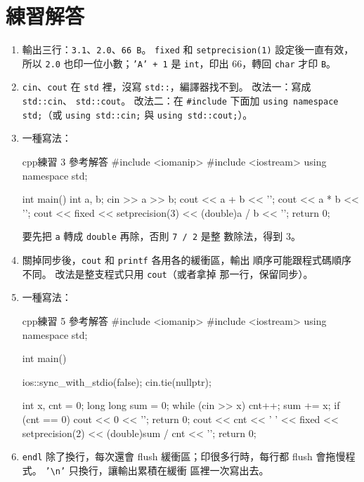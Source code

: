 \section*{練習解答}

\begin{enumerate}
\item 輸出三行：\texttt{3.1}、\texttt{2.0}、\texttt{66 B}。
\texttt{fixed} 和 \texttt{setprecision(1)} 設定後一直有效，所以
\texttt{2.0} 也印一位小數；\texttt{'A' + 1} 是 \texttt{int}，印出
$66$，轉回 \texttt{char} 才印 \texttt{B}。
\item \texttt{cin}、\texttt{cout} 在 \texttt{std} 裡，沒寫
\texttt{std::}，編譯器找不到。 改法一：寫成 \texttt{std::cin}、
\texttt{std::cout}。 改法二：在 \texttt{\#include} 下面加
\texttt{using namespace std;}（或 \texttt{using std::cin;} 與
\texttt{using std::cout;}）。
\item 一種寫法：
\begin{code}{cpp}{練習 3 參考解答}
#include <iomanip>
#include <iostream>
using namespace std;

int main() {
    int a, b;
    cin >> a >> b;
    cout << a + b << '\n';
    cout << a * b << '\n';
    cout << fixed << setprecision(3) << (double)a / b << '\n';
    return 0;
}
\end{code}
要先把 \texttt{a} 轉成 \texttt{double} 再除，否則 \texttt{7 / 2} 是整
數除法，得到 $3$。
\item 關掉同步後，\texttt{cout} 和 \texttt{printf} 各用各的緩衝區，輸出
順序可能跟程式碼順序不同。 改法是整支程式只用 \texttt{cout}（或者拿掉
那一行，保留同步）。
\item 一種寫法：
\begin{code}{cpp}{練習 5 參考解答}
#include <iomanip>
#include <iostream>
using namespace std;

int main() {
    ios::sync_with_stdio(false);
    cin.tie(nullptr);

    int x, cnt = 0;
    long long sum = 0;
    while (cin >> x) {
        cnt++;
        sum += x;
    }
    if (cnt == 0) {
        cout << 0 << '\n';
        return 0;
    }
    cout << cnt << ' ' << fixed << setprecision(2) << (double)sum / cnt << '\n';
    return 0;
}
\end{code}
\item \texttt{endl} 除了換行，每次還會 flush 緩衝區；印很多行時，每行都
flush 會拖慢程式。 \texttt{'\textbackslash n'} 只換行，讓輸出累積在緩衝
區裡一次寫出去。
\end{enumerate}
